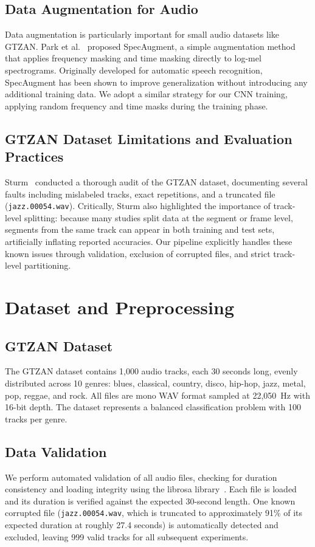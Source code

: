 \documentclass[10pt,journal]{IEEEtran}
\begin{document}
\subsection{Data Augmentation for Audio}

Data augmentation is particularly important for small audio datasets like GTZAN. Park et al.~\cite{park2019specaugment} proposed SpecAugment, a simple augmentation method that applies frequency masking and time masking directly to log-mel spectrograms. Originally developed for automatic speech recognition, SpecAugment has been shown to improve generalization without introducing any additional training data. We adopt a similar strategy for our CNN training, applying random frequency and time masks during the training phase.

\subsection{GTZAN Dataset Limitations and Evaluation Practices}

Sturm~\cite{sturm2013gtzan} conducted a thorough audit of the GTZAN dataset, documenting several faults including mislabeled tracks, exact repetitions, and a truncated file (\texttt{jazz.00054.wav}). Critically, Sturm also highlighted the importance of track-level splitting: because many studies split data at the segment or frame level, segments from the same track can appear in both training and test sets, artificially inflating reported accuracies. Our pipeline explicitly handles these known issues through validation, exclusion of corrupted files, and strict track-level partitioning.

\section{Dataset and Preprocessing}

\subsection{GTZAN Dataset}
The GTZAN dataset contains 1,000 audio tracks, each 30 seconds long, evenly distributed across 10 genres: blues, classical, country, disco, hip-hop, jazz, metal, pop, reggae, and rock. All files are mono WAV format sampled at 22,050~Hz with 16-bit depth. The dataset represents a balanced classification problem with 100 tracks per genre.

\subsection{Data Validation}
We perform automated validation of all audio files, checking for duration consistency and loading integrity using the librosa library~\cite{mcfee2015librosa}. Each file is loaded and its duration is verified against the expected 30-second length. One known corrupted file (\texttt{jazz.00054.wav}, which is truncated to approximately 91\% of its expected duration at roughly 27.4 seconds) is automatically detected and excluded, leaving 999 valid tracks for all subsequent experiments.
\end{document}

